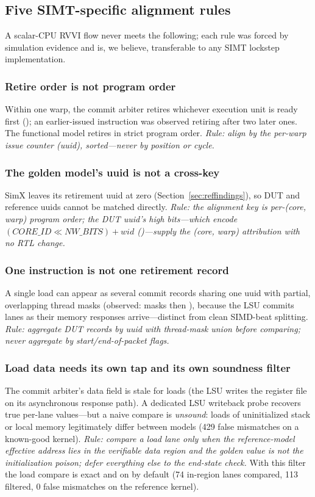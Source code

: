 \documentclass[conference]{IEEEtran}
\newcommand{\code}[1]{\texttt{\detokenize{#1}}}
\begin{document}
\subsection{Five SIMT-specific alignment rules}
\label{sec:rules}
A scalar-CPU RVVI flow never meets the following; each rule was forced
by simulation evidence and is, we believe, transferable to any SIMT
lockstep implementation.

\subsubsection{Retire order is not program order}
Within one warp, the commit arbiter retires whichever execution unit is
ready first (\code{VX_commit.sv:56-71}); an earlier-issued instruction
was observed retiring after two later ones. The functional model retires
in strict program order. \emph{Rule: align by the per-warp issue counter
	(uuid), sorted---never by position or cycle.}

\subsubsection{The golden model's uuid is not a cross-key}
SimX leaves its retirement uuid at zero (Section~\ref{sec:reffindings}),
so DUT and reference uuids cannot be matched directly. \emph{Rule: the
	alignment key is per-(core, warp) program order; the DUT uuid's high
	bits---which encode $(\textit{CORE\_ID} \ll \textit{NW\_BITS}) +
		\textit{wid}$ (\code{VX_uuid_gen.sv:40})---supply the (core, warp)
	attribution with no RTL change.}

\subsubsection{One instruction is not one retirement record}
A single load can appear as several commit records sharing one uuid
with partial, overlapping thread masks (observed: masks \code{0xd} then
\code{0xe}), because the LSU commits lanes as their memory responses
arrive---distinct from clean SIMD-beat splitting. \emph{Rule: aggregate
	DUT records by uuid with thread-mask union before comparing; never
	aggregate by start/end-of-packet flags.}

\subsubsection{Load data needs its own tap and its own soundness filter}
The commit arbiter's data field is stale for loads (the LSU writes the
register file on its asynchronous response path). A dedicated LSU
writeback probe recovers true per-lane values---but a naive compare is
\emph{unsound}: loads of uninitialized stack or local memory
legitimately differ between models (429 false mismatches on a known-good
kernel). \emph{Rule: compare a load lane only when the reference-model
	effective address lies in the verifiable data region and the golden
	value is not the initialization poison; defer everything else to the
	end-state check.} With this filter the load compare is exact and on by
default (74 in-region lanes compared, 113 filtered, 0 false mismatches
on the reference kernel).
\end{document}
